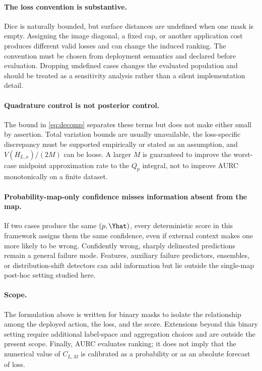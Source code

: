 \paragraph{The loss convention is substantive.}
Dice is naturally bounded, but surface distances are undefined when one mask is empty.
Assigning the image diagonal, a fixed cap, or another application cost produces
different valid losses and can change the induced ranking. The convention must be
chosen from deployment semantics and declared before evaluation. Dropping undefined
cases changes the evaluated population and should be treated as a sensitivity
analysis rather than a silent implementation detail.

\paragraph{Quadrature control is not posterior control.}
The bound in \eqref{eq:decomp} separates these terms but does not make either small by
assertion. Total variation bounds are usually unavailable, the loss-specific
discrepancy must be supported empirically or stated as an assumption, and
$V(H_{L,x})/(2M)$ can be loose. A larger $M$ is guaranteed to improve the worst-case
midpoint approximation rate to the $Q_p$ integral, not to improve AURC monotonically
on a finite dataset.

\paragraph{Probability-map-only confidence misses information absent from the map.}
If two cases produce the same $(p,\Yhat)$, every deterministic score in this framework
assigns them the same confidence, even if external context makes one more likely to be
wrong. Confidently wrong, sharply delineated predictions remain a general failure
mode. Features, auxiliary failure predictors, ensembles, or distribution-shift
detectors can add information but lie outside the single-map post-hoc setting studied
here.

\paragraph{Scope.}
The formulation above is written for binary masks to isolate the relationship among
the deployed action, the loss, and the score. Extensions beyond this binary setting
require additional label-space and aggregation choices and are outside the present
scope. Finally, AURC evaluates ranking; it does not imply that the numerical value of
$C_{L,M}$ is calibrated as a probability or as an absolute forecast of loss.

